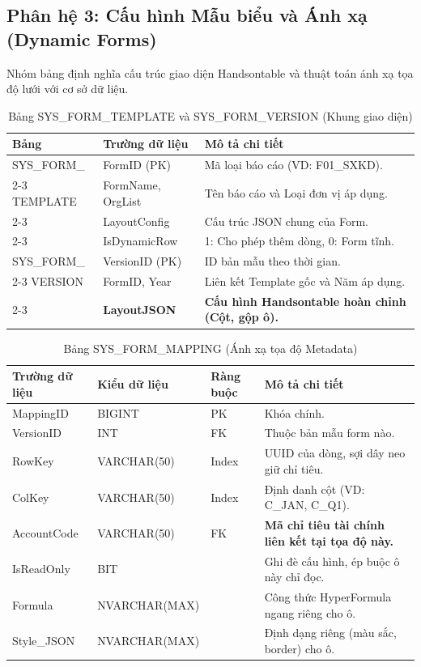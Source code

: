 \documentclass[12pt,a4paper]{article}
\begin{document}
\subsection{Phân hệ 3: Cấu hình Mẫu biểu và Ánh xạ (Dynamic Forms)}
Nhóm bảng định nghĩa cấu trúc giao diện Handsontable và thuật toán ánh xạ tọa độ lưới với cơ sở dữ liệu.

\begin{table}[h!]
    \centering
    \caption{Bảng SYS\_FORM\_TEMPLATE và SYS\_FORM\_VERSION (Khung giao diện)}
    \begin{tabularx}{\textwidth}{|l|l|X|}
        \hline
        \textbf{Bảng} & \textbf{Trường dữ liệu} & \textbf{Mô tả chi tiết} \\ \hline
        SYS\_FORM\_ & FormID (PK) & Mã loại báo cáo (VD: F01\_SXKD). \\ \cline{2-3}
        TEMPLATE  & FormName, OrgList & Tên báo cáo và Loại đơn vị áp dụng. \\ \cline{2-3}
                  & LayoutConfig & Cấu trúc JSON chung của Form. \\ \cline{2-3}
                  & IsDynamicRow & 1: Cho phép thêm dòng, 0: Form tĩnh. \\ \hline
        SYS\_FORM\_ & VersionID (PK) & ID bản mẫu theo thời gian. \\ \cline{2-3}
        VERSION   & FormID, Year & Liên kết Template gốc và Năm áp dụng. \\ \cline{2-3}
                  & \textbf{LayoutJSON} & \textbf{Cấu hình Handsontable hoàn chỉnh (Cột, gộp ô).} \\ \hline
    \end{tabularx}
\end{table}

\begin{table}[h!]
    \centering
    \caption{Bảng SYS\_FORM\_MAPPING (Ánh xạ tọa độ Metadata)}
    \begin{tabularx}{\textwidth}{|l|l|l|X|}
        \hline
        \textbf{Trường dữ liệu} & \textbf{Kiểu dữ liệu} & \textbf{Ràng buộc} & \textbf{Mô tả chi tiết} \\ \hline
        MappingID & BIGINT & PK & Khóa chính. \\ \hline
        VersionID & INT & FK & Thuộc bản mẫu form nào. \\ \hline
        RowKey & VARCHAR(50) & Index & UUID của dòng, sợi dây neo giữ chỉ tiêu. \\ \hline
        ColKey & VARCHAR(50) & Index & Định danh cột (VD: C\_JAN, C\_Q1). \\ \hline
        AccountCode & VARCHAR(50) & FK & \textbf{Mã chỉ tiêu tài chính liên kết tại tọa độ này.} \\ \hline
        IsReadOnly & BIT & & Ghi đè cấu hình, ép buộc ô này chỉ đọc. \\ \hline
        Formula & NVARCHAR(MAX)& & Công thức HyperFormula ngang riêng cho ô. \\ \hline
        Style\_JSON & NVARCHAR(MAX)& & Định dạng riêng (màu sắc, border) cho ô. \\ \hline
    \end{tabularx}
\end{table}
\end{document}
